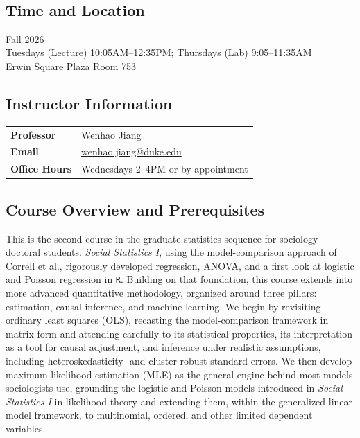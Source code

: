 \documentclass[12pt]{article}
\begin{document}
\noindent {\Large \textcolor{titlecolor}{SOCIOL 723 Social Statistics II \\[3pt] Estimation, Causal Inference, and Machine Learning}}\\[0pt]

\subsection*{Time and Location}

Fall 2026\\
Tuesdays (Lecture) 10:05AM--12:35PM; Thursdays (Lab) 9:05--11:35AM\\
Erwin Square Plaza Room 753

\vspace{0.5em}

\subsection*{Instructor Information}

\begin{tabular}{@{}l l@{}}
\textbf{\textcolor{titlecolor}{Professor}} & Wenhao Jiang \\
\textbf{\textcolor{titlecolor}{Email}} & \href{mailto:wenhao.jiang@duke.edu}{wenhao.jiang@duke.edu} \\
\textbf{\textcolor{titlecolor}{Office Hours}} & Wednesdays 2--4PM or by appointment \\
\end{tabular}

\vspace{0.5em}

\subsection*{Course Overview and Prerequisites}

This is the second course in the graduate statistics sequence for sociology doctoral students. \textit{Social Statistics I}, using the model-comparison approach of Correll et al., rigorously developed regression, ANOVA, and a first look at logistic and Poisson regression in \texttt{R}. Building on that foundation, this course extends into more advanced quantitative methodology, organized around three pillars: estimation, causal inference, and machine learning. We begin by revisiting ordinary least squares (OLS), recasting the model-comparison framework in matrix form and attending carefully to its statistical properties, its interpretation as a tool for causal adjustment, and inference under realistic assumptions, including heteroskedasticity- and cluster-robust standard errors. We then develop maximum likelihood estimation (MLE) as the general engine behind most models sociologists use, grounding the logistic and Poisson models introduced in \textit{Social Statistics I} in likelihood theory and extending them, within the generalized linear model framework, to multinomial, ordered, and other limited dependent variables.
\end{document}
